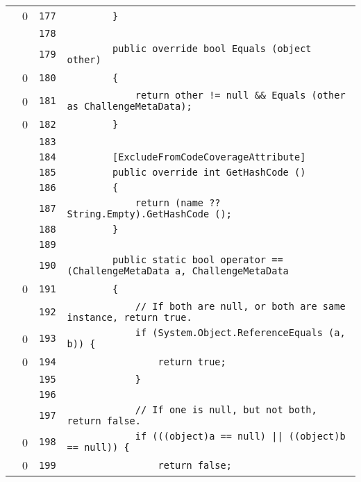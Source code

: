\documentclass[a4paper,10pt]{article}
\begin{document}
\begin{longtable}[l]{lrrl}
\cellcolor{red} & 0 & \verb~177~ & \verb~        }~\\
\cellcolor{gray} &  & \verb~178~ & \verb~~\\
\cellcolor{gray} &  & \verb~179~ & \verb~        public override bool Equals (object other)~\\
\cellcolor{red} & 0 & \verb~180~ & \verb~        {~\\
\cellcolor{red} & 0 & \verb~181~ & \verb~            return other != null && Equals (other as ChallengeMetaData);~\\
\cellcolor{red} & 0 & \verb~182~ & \verb~        }~\\
\cellcolor{gray} &  & \verb~183~ & \verb~~\\
\cellcolor{gray} &  & \verb~184~ & \verb~        [ExcludeFromCodeCoverageAttribute]~\\
\cellcolor{gray} &  & \verb~185~ & \verb~        public override int GetHashCode ()~\\
\cellcolor{gray} &  & \verb~186~ & \verb~        {~\\
\cellcolor{gray} &  & \verb~187~ & \verb~            return (name ?? String.Empty).GetHashCode ();~\\
\cellcolor{gray} &  & \verb~188~ & \verb~        }~\\
\cellcolor{gray} &  & \verb~189~ & \verb~~\\
\cellcolor{gray} &  & \verb~190~ & \verb~        public static bool operator == (ChallengeMetaData a, ChallengeMetaData~\\
\cellcolor{red} & 0 & \verb~191~ & \verb~        {~\\
\cellcolor{gray} &  & \verb~192~ & \verb~            // If both are null, or both are same instance, return true.~\\
\cellcolor{red} & 0 & \verb~193~ & \verb~            if (System.Object.ReferenceEquals (a, b)) {~\\
\cellcolor{red} & 0 & \verb~194~ & \verb~                return true;~\\
\cellcolor{gray} &  & \verb~195~ & \verb~            }~\\
\cellcolor{gray} &  & \verb~196~ & \verb~~\\
\cellcolor{gray} &  & \verb~197~ & \verb~            // If one is null, but not both, return false.~\\
\cellcolor{red} & 0 & \verb~198~ & \verb~            if (((object)a == null) || ((object)b == null)) {~\\
\cellcolor{red} & 0 & \verb~199~ & \verb~                return false;~\\

\end{longtable}
\end{document}
